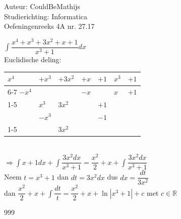 \documentclass[a4paper]{article}
\newcommand{\intt}{\displaystyle\int}
\begin{document}
  
\noindent \large Auteur: CouldBeMathijs \\
\noindent \large Studierichting: Informatica\\
\noindent \large Oefeningenreeks 4A nr. 27.17\\

\medskip

\normalsize

$\intt \dfrac{x^4 + x^3 + 3x^2 + x + 1}{x^3+1}dx$\\

Euclidische deling:\\


\begin{tabular}{lllll|ll}
$x^4$ & $+x^3$ & $+3x^2$ & $+x$ & $+1$ & $x^3$ & $+1$\\ \cline{6-7}
$-x^4$& & & $-x$ && $x$ & $+1$\\ \cline{1-5}
& $x^3$ & $3x^2$ & & $ +1$\\
& $-x^3$ & & & $ -1$\\ \cline{1-5}
& & $3x^2$ & &\\
\end{tabular}\\

$\Rightarrow \intt x + 1 dx + \int \dfrac{3x^2dx}{x^3 + 1} = \dfrac{x^2}{2} + x + \int \dfrac{3x^2dx}{x^3 + 1}$\\

Neem $t = x^3 + 1$ dan $dt = 3x^2 dx$ dus $dx = \dfrac{dt}{3x^2}$\\

dan $\dfrac{x^2}{2} + x + \intt \dfrac{dt}{t} = \dfrac{x^2}{2} + x + \ln |x^3 + 1| + c$ met $c \in \mathbb{R}$
\begin{thebibliography}{999}
\end{thebibliography}
\end{document}
